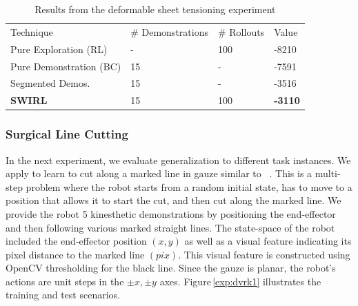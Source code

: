 \begin{table}[ht]
\centering
\scriptsize
\caption{Results from the deformable sheet tensioning experiment}
\label{my-label}
\begin{tabular}{llll}
\rowcolor[HTML]{000000} 
{\color[HTML]{FFFFFF} Technique} & {\color[HTML]{FFFFFF} \# Demonstrations} & {\color[HTML]{FFFFFF} \# Rollouts} & {\color[HTML]{FFFFFF} Value} \\
Pure Exploration (RL)                   & -                                        & 100                                & -8210                        \\
Pure Demonstration  (BC)                            & 15                                       & -                                  & -7591                        \\
Segmented Demos.                  & 15                                       & -                                  & -3516                        \\
\textbf{SWIRL}                  & 15                                       & 100                                & \textbf{-3110}                    
\end{tabular}
\end{table}


\subsubsection{Surgical Line Cutting}
In the next experiment, we evaluate generalization to different task instances.
We apply \hirl to learn to cut along a marked line in gauze similar to ~\cite{murali2015learning}.
This is a multi-step problem where the robot starts from a random initial state, has to move to a position that allows it to start the cut, and then cut along the marked line.
We provide the robot 5 kinesthetic demonstrations by positioning the end-effector and then following various marked straight lines.
The state-space of the robot included the end-effector position $(x,y)$ as well as a visual feature indicating its pixel distance to the marked line $(pix)$.
This visual feature is constructed using OpenCV thresholding for the black line.
Since the gauze is planar, the robot's actions are unit steps in the $\pm x, \pm y$ axes.
Figure\,\ref{exp:dvrk1} illustrates the training and test scenarios.

